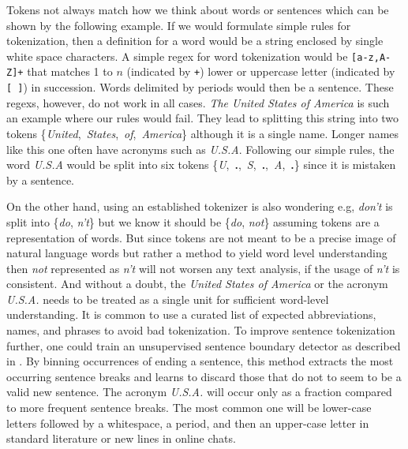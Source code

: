 Tokens not always match how we think about words or sentences which can be shown by the following example.
If we would formulate simple rules for tokenization, then a definition for a word would be a string enclosed by single white space characters.
A simple regex for word tokenization would be \texttt{[a-z,A-Z]+} that matches 1 to $n$ (indicated by \texttt{+}) lower or uppercase letter (indicated by \texttt{[ ]}) in succession.
Words delimited by periods would then be a sentence.
These regexs, however, do not work in all cases.
\textit{The United States of America} is such an example where our rules would fail. They lead to splitting this string into two tokens \mbox{\{\textquotesingle \textit{United}\textquotesingle, \textquotesingle \textit{States}\textquotesingle, \textquotesingle \textit{of}\textquotesingle, \textquotesingle \textit{America}\textquotesingle\}} although it is a single name.
Longer names like this one often have acronyms such as \textit{U.S.A}.
Following our simple rules, the word \textit{U.S.A} would be split into six tokens \mbox{\{\textquotesingle \textit{U}\textquotesingle, \textquotesingle \textbf{.}\textquotesingle, \textquotesingle \textit{S}\textquotesingle, \textquotesingle \textbf{.}\textquotesingle, \textquotesingle \textit{A}\textquotesingle, \textquotesingle \textbf{.}\textquotesingle\}} since it is mistaken by a sentence.

On the other hand, using an established tokenizer is also wondering e.g, \textit{don't} is split into \{\textquotesingle \textit{do}\textquotesingle, \textquotesingle \textit{n't}\textquotesingle\} but we know it should be \{\textquotesingle \textit{do}\textquotesingle, \textquotesingle \textit{not}\textquotesingle\} assuming tokens are a representation of words.
But since tokens are not meant to be a precise image of natural language words but rather a method to yield word level understanding then \textit{not} represented as \textit{n't} will not worsen any text analysis, if the usage of \textit{n't} is consistent.
And without a doubt, the \textit{United States of America} or the acronym \textit{U.S.A.} needs to be treated as a single unit for sufficient word-level understanding.
It is common to use a curated list of expected abbreviations, names, and phrases to avoid bad tokenization.
To improve sentence tokenization further, one could train an unsupervised sentence boundary detector as described in \cite{Kiss2006}.
By binning occurrences of ending a sentence, this method extracts the most occurring sentence breaks and learns to discard those that do not to seem to be a valid new sentence.
The acronym \textit{U.S.A.} will occur only as a fraction compared to more frequent sentence breaks.
The most common one will be lower-case letters followed by a whitespace, a period, and then an upper-case letter in standard literature or new lines in online chats.

